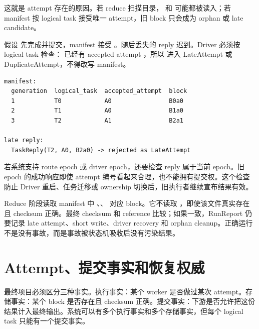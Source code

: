 这就是 attempt 存在的原因。若 reduce 扫描目录， 和  可能都被读入；若 manifest 按 logical task 接受唯一 attempt，旧 block 只会成为 orphan 或 late candidate。

假设  先完成并提交，manifest 接受 。随后丢失的  reply 迟到。Driver 必须按 logical task 检查： 已经有 accepted attempt ，所以  进入 LateAttempt 或 DuplicateAttempt，不得改写 manifest。

\begin{lstlisting}[numbers=none,caption={T2 最终 manifest 和迟到响应}]
manifest:
  generation  logical_task  accepted_attempt  block
  1           T0            A0                B0a0
  2           T1            A0                B1a0
  3           T2            A1                B2a1

late reply:
  TaskReply(T2, A0, B2a0) -> rejected as LateAttempt
\end{lstlisting}

若系统支持 route epoch 或 driver epoch，还要检查 reply 属于当前 epoch。旧 epoch 的成功响应即使 attempt 编号看起来合理，也不能拥有提交权。这个检查防止 Driver 重启、任务迁移或 ownership 切换后，旧执行者继续宣布结果有效。

Reduce 阶段读取 manifest 中 、、 对应 block。它不读取 ，即使该文件真实存在且 checksum 正确。最终 checksum 和 reference 比较；如果一致，RunReport 仍要记录 late attempt、short write、driver recovery 和 orphan cleanup。正确运行不是没有事故，而是事故被状态机吸收后没有污染结果。

\section{Attempt、提交事实和恢复权威}

最终项目必须区分三种事实。执行事实：某个 worker 是否做过某次 attempt。存储事实：某个 block 是否存在且 checksum 正确。提交事实：下游是否允许把这份结果计入最终输出。系统可以有多个执行事实和多个存储事实，但每个 logical task 只能有一个提交事实。

